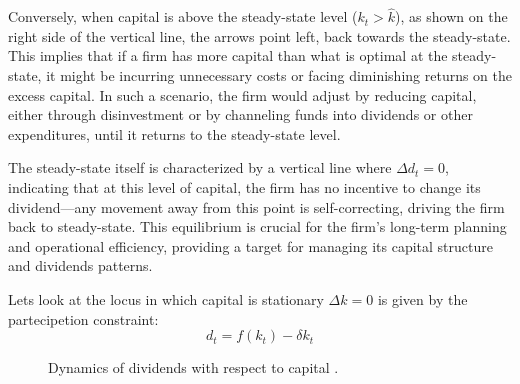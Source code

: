 \documentclass[12pt]{article}
\begin{document}
Conversely, when capital is above the steady-state level (\(k_t > \hat{k}\)), as shown on  the right side of the
vertical line, the  arrows point left, back towards the steady-state. This implies that if a firm has more capital than
what is optimal at the steady-state, it might be incurring unnecessary costs or facing diminishing returns on the excess
capital. In such a scenario, the firm would adjust by reducing capital, either through disinvestment or by channeling
funds into dividends or other expenditures, until it returns to the steady-state level.
 
The steady-state itself is characterized by a vertical line where \(\Delta d_t = 0\), indicating that at this level of
capital, the firm has no incentive to change its dividend—any movement away from this point is self-correcting,
driving the firm back to steady-state. This equilibrium is crucial for the firm's long-term planning and operational
efficiency, providing a target for managing its capital structure and dividends patterns.

Lets look at the locus in which capital is stationary \(\Delta k = 0\) is given by the partecipetion constraint:
\[d_{t}=f\left(k_t\right) -\delta k_t\]
\begin{figure}
    \centering
    \caption{Dynamics of dividends with respect to capital .}
\end{figure}
\end{document}
